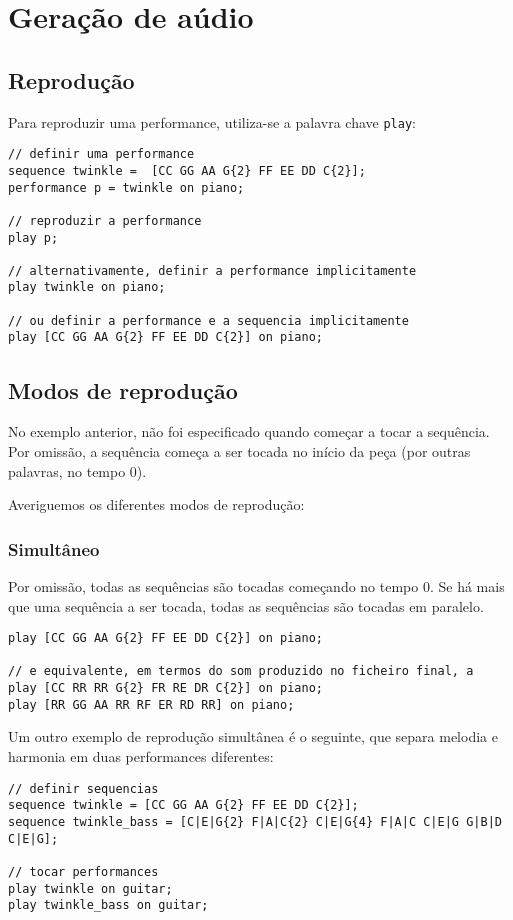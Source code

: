 \documentclass{article}
\begin{document}
\section{Geração de aúdio} \label{audio}
\subsection{Reprodução}
Para reproduzir uma performance, utiliza-se a palavra chave \texttt{play}:
\begin{lstlisting} 
// definir uma performance
sequence twinkle =  [CC GG AA G{2} FF EE DD C{2}];
performance p = twinkle on piano;

// reproduzir a performance
play p;

// alternativamente, definir a performance implicitamente
play twinkle on piano;

// ou definir a performance e a sequencia implicitamente
play [CC GG AA G{2} FF EE DD C{2}] on piano;
\end{lstlisting} 
\subsection{Modos de reprodução}
No exemplo anterior, não foi especificado quando começar a tocar a sequência. Por omissão, a sequência começa a ser tocada no início da peça (por outras palavras, no tempo 0).

Averiguemos os diferentes modos de reprodução:

\subsubsection{Simultâneo}
Por omissão, todas as sequências são tocadas começando no tempo 0. Se há mais que uma sequência a ser tocada, todas as sequências são tocadas em paralelo.

\begin{lstlisting} 
play [CC GG AA G{2} FF EE DD C{2}] on piano;

// e equivalente, em termos do som produzido no ficheiro final, a
play [CC RR RR G{2} FR RE DR C{2}] on piano;
play [RR GG AA RR RF ER RD RR] on piano;
\end{lstlisting}

Um outro exemplo de reprodução simultânea é o seguinte, que separa melodia e harmonia em duas performances diferentes:
\begin{lstlisting} 
// definir sequencias
sequence twinkle = [CC GG AA G{2} FF EE DD C{2}];
sequence twinkle_bass = [C|E|G{2} F|A|C{2} C|E|G{4} F|A|C C|E|G G|B|D C|E|G];

// tocar performances
play twinkle on guitar;
play twinkle_bass on guitar;
\end{lstlisting}
\end{document}
